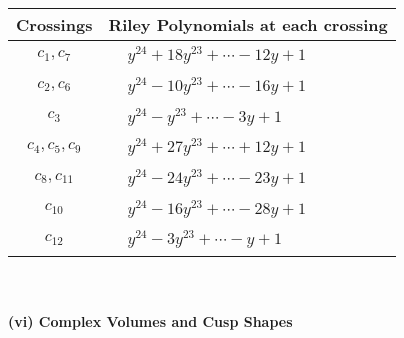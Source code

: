 \documentclass[1p]{elsarticle_modified}
\theoremstyle{definition}
\begin{document}
\begin{tabular}{m{50pt}|m{274pt}}
Crossings & \hspace{64pt}Riley Polynomials at each crossing \\
\hline $$\begin{aligned}c_{1},c_{7}\end{aligned}$$&$\begin{aligned}
&y^{24}+18 y^{23}+\cdots-12 y+1
\end{aligned}$\\
\hline $$\begin{aligned}c_{2},c_{6}\end{aligned}$$&$\begin{aligned}
&y^{24}-10 y^{23}+\cdots-16 y+1
\end{aligned}$\\
\hline $$\begin{aligned}c_{3}\end{aligned}$$&$\begin{aligned}
&y^{24}- y^{23}+\cdots-3 y+1
\end{aligned}$\\
\hline $$\begin{aligned}c_{4},c_{5},c_{9}\end{aligned}$$&$\begin{aligned}
&y^{24}+27 y^{23}+\cdots+12 y+1
\end{aligned}$\\
\hline $$\begin{aligned}c_{8},c_{11}\end{aligned}$$&$\begin{aligned}
&y^{24}-24 y^{23}+\cdots-23 y+1
\end{aligned}$\\
\hline $$\begin{aligned}c_{10}\end{aligned}$$&$\begin{aligned}
&y^{24}-16 y^{23}+\cdots-28 y+1
\end{aligned}$\\
\hline $$\begin{aligned}c_{12}\end{aligned}$$&$\begin{aligned}
&y^{24}-3 y^{23}+\cdots- y+1
\end{aligned}$\\
\hline
\end{tabular}\\~\\
\newpage\flushleft \textbf{(vi) Complex Volumes and Cusp Shapes}
\end{document}
